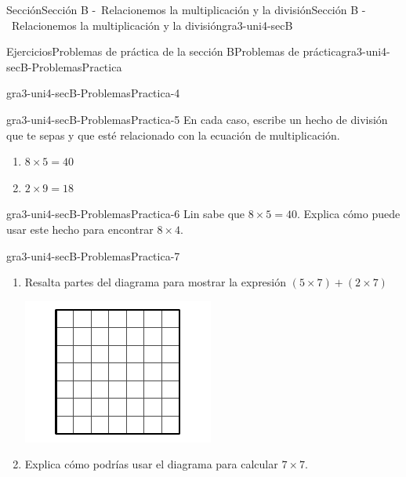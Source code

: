 \documentclass[twoside,10pt,]{article}
\begin{document}
\begin{sectionptx}{Sección}{Sección B -~Relacionemos la multiplicación y la división}{}{Sección B -~Relacionemos la multiplicación y la división}{}{}{gra3-uni4-secB}
\begin{exercises-subsection}{Ejercicios}{Problemas de práctica de la sección B}{}{Problemas de práctica}{}{}{gra3-uni4-secB-ProblemasPractica}
\begin{divisionexercise}{2}{}{}{gra3-uni4-secB-ProblemasPractica-4}
\end{divisionexercise}%
\begin{divisionexercise}{3}{}{}{gra3-uni4-secB-ProblemasPractica-5}%
En cada caso, escribe un hecho de división que te sepas y que esté relacionado con la ecuación de multiplicación.%
%
\begin{enumerate}[label=(\alph*)]
\item{}\(\displaystyle 8 \times 5 = 40\)%
\item{}\(\displaystyle 2 \times 9 = 18\)%
\end{enumerate}
\end{divisionexercise}%
\begin{divisionexercise}{4}{}{}{gra3-uni4-secB-ProblemasPractica-6}%
Lin sabe que \(8 \times 5 = 40\). Explica cómo puede usar este hecho para encontrar \(8 \times 4\).%
\end{divisionexercise}%
\begin{divisionexercise}{5}{}{}{gra3-uni4-secB-ProblemasPractica-7}%
%
\begin{enumerate}[label=(\alph*)]
\item{}Resalta partes del diagrama para mostrar la expresión \((5 \times 7) + (2 \times 7)\)%
\begin{image}{0}{1}{0}{}%
\includegraphics[width=\linewidth]{external/svg-source/tikz-file-151677.pdf}
\end{image}%
\item{}Explica cómo podrías usar el diagrama para calcular \(7\times 7\).%
\end{enumerate}
\end{divisionexercise}%

\end{exercises-subsection}
\end{sectionptx}
\end{document}
